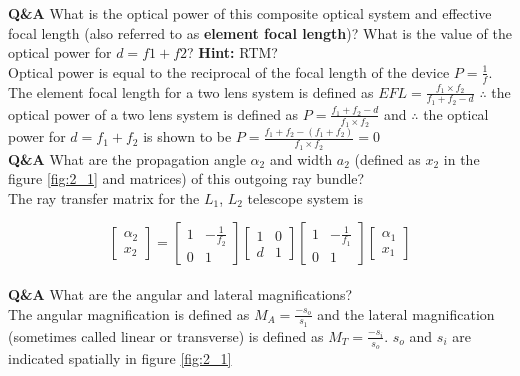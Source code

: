 \documentclass[main.tex]{subfiles}
\begin{document}
\textbf{Q\&A} What is the optical power of this composite optical system and effective focal length (also referred to as \textbf{element focal length})? What is the value of the optical power for $d=f1+f2$? \textbf{Hint:} RTM?\\

Optical power is equal to the reciprocal of the focal length of the device $P=\frac{1}{f}$. The element focal length for a two lens system is defined as $EFL = \frac{f_1 \times f_2}{f_1 + f_2 - d}$ $\therefore$ the optical power of a two lens system is defined as $P=\frac{f_1 + f_2 -d}{f_1 \times f_2}$ and $\therefore$ the optical power for $d=f_1 + f_2$ is shown to be $P=\frac{f_1 + f_2 - (f_1 + f_2)}{f_1 \times f_2} = 0$\\

\textbf{Q\&A} What are the propagation angle $\alpha_2$ and width $a_2$ (defined as $x_2$ in the figure \ref{fig:2_1} and matrices) of this outgoing ray bundle? \\


The ray transfer matrix for the $L_1$, $L_2$ telescope system is

\begin{equation}
\begin{bmatrix}
    \alpha_2 \\
    x_2
\end{bmatrix}
=
\begin{bmatrix}
    1   & -\frac{1}{f_2} \\
    0   &   1
\end{bmatrix}
\begin{bmatrix}
    1   &   0 \\
    d   &   1
\end{bmatrix}
\begin{bmatrix}
    1   & -\frac{1}{f_1} \\
    0   &   1
\end{bmatrix}
\begin{bmatrix}
    \alpha_{1}  \\
    x_1
\end{bmatrix}
\end{equation}\\


\textbf{Q\&A} What are the angular and lateral magnifications?\\

The angular magnification is defined as $M_A = \frac{-s_o}{s_1}$ and the lateral magnification (sometimes called linear or transverse) is defined as $M_T = \frac{-s_i}{s_o}$. $s_o$ and $s_i$ are indicated spatially in figure \ref{fig:2_1}\\
\end{document}
